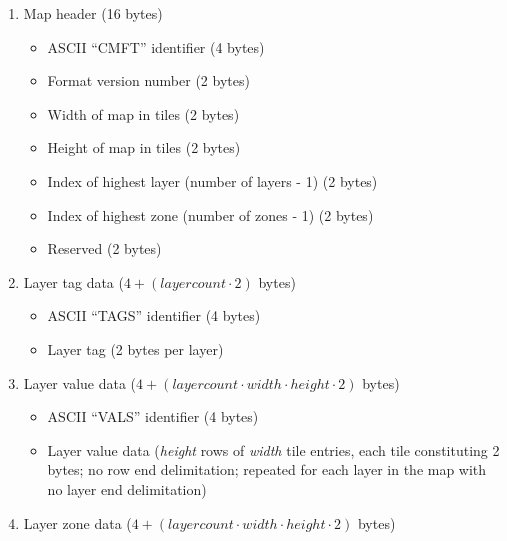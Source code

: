 \documentclass [12pt,a4paper]{article}
\begin{document}
\begin{enumerate}

  \item Map header (16 bytes)
  
  \begin{itemize}

    \item ASCII ``CMFT'' identifier (4 bytes)
    \item Format version number (2 bytes)
    \item Width of map in tiles (2 bytes)
    \item Height of map in tiles (2 bytes)
    \item Index of highest layer (number of layers - 1) (2 bytes)
    \item Index of highest zone (number of zones - 1) (2 bytes)
    \item Reserved (2 bytes)

  \end{itemize}


  \item Layer tag data ($4 + (layercount\cdot{}2)$ bytes) 
  
  \begin{itemize}

    \item ASCII ``TAGS'' identifier (4 bytes)
    \item Layer tag (2 bytes per layer)

  \end{itemize}


  \item Layer value data ($4 + (layercount\cdot{}width\cdot{}height\cdot{}2)$ bytes) 
  
  \begin{itemize}

    \item ASCII ``VALS'' identifier (4 bytes)
    \item Layer value data (\emph{height} rows of \emph{width} tile entries,
      each tile constituting 2 bytes; no row end delimitation;
      repeated for each layer in the map with no layer end delimitation)

  \end{itemize}


  \item Layer zone data ($4 + (layercount\cdot{}width\cdot{}height\cdot{}2)$ bytes) 
  
  \begin{itemize}


\end{itemize}
\end{enumerate}
\end{document}
